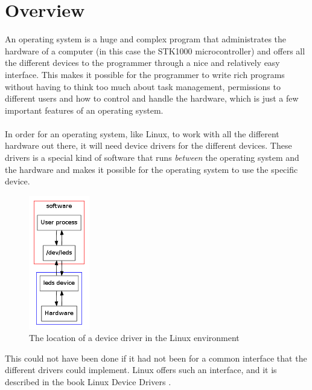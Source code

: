 \section{Overview}
An operating system is a huge and complex program that 
administrates the hardware of a computer (in this case the
STK1000 microcontroller) and offers all the different devices
to the programmer through a nice and relatively easy interface. This makes 
it possible for the programmer to write rich
programs without having to think too much about task management,
permissions to different users and how to control and handle
the hardware, which is just a few important features of an
operating system.\\
\\
In order for an operating system, like Linux, 
to work with all the different hardware out there, it will need
device drivers for the different devices. These drivers is a 
special kind of software that runs \textit{between} the operating
system and the hardware and makes it possible
for the operating system to use the specific device.
\begin{figure}[h]
  \centerline{\includegraphics[width=100px]{graphics/device_driver.png}}
  \caption{The location of a device driver in the Linux environment}
  \label{device-driver}
\end{figure}
This could
not have been done if it had not been for a common interface that 
the different drivers could implement. Linux offers such an 
interface, and it is described in the book 
Linux Device Drivers \cite{linux-device-drivers}.\\
\\
